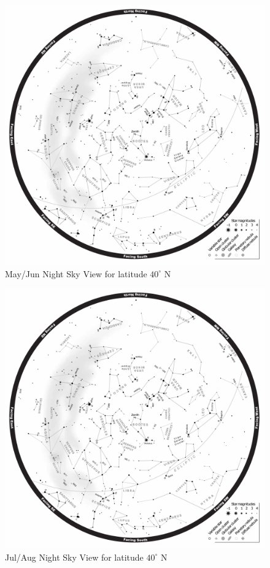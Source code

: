 \documentclass[a4paper,12pt]{extarticle}
\begin{document}
\clearpage
\begin{figure}
    \centering
    \includegraphics[width=0.9 \linewidth]{may-jun.png}
    \caption{May/Jun Night Sky View for latitude $40^\circ$ N}
\end{figure}
\clearpage
\begin{figure}
    \centering
    \includegraphics[width=0.9 \linewidth]{may-jun.png}
    \caption{Jul/Aug Night Sky View for latitude $40^\circ$ N}
\end{figure}
\end{document}
